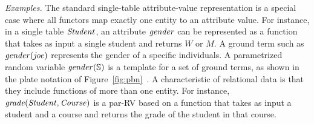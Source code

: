 \documentclass{article} %
\begin{document}
{\em Examples.} The standard single-table attribute-value representation is a special case where all functors map exactly one entity to an attribute value. For instance, in a single table $\it{Student}$, an attribute $\it{gender}$ can be represented as a function that takes as input a single student and returns $W$ or $M$. A ground term such as $\it{gender}(\it{joe})$ represents the gender of a specific individuals. A parametrized random variable $\it{gender}(\S)$ is a template for a set of ground terms, as shown in the plate notation of Figure~\ref{fig:pbn}~\cite{Kimmig2015}. A characteristic of relational data is that they include functions of more than one entity. For instance, $\it{grade}(\it{Student},\it{Course})$ is a par-RV based on a function that takes as input a student and a course and returns the grade of the student in that course.

\end{document}
